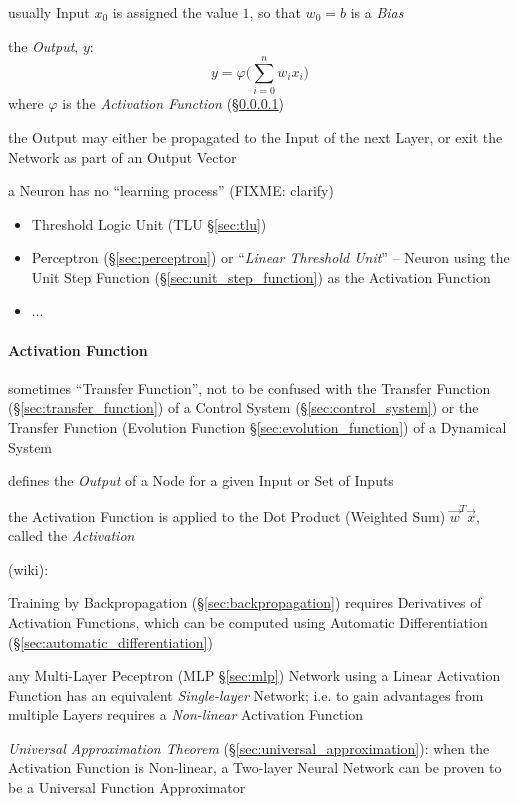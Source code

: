 usually Input $x_0$ is assigned the value $1$, so that $w_0 = b$ is a
\emph{Bias}

the \emph{Output}, $y$:
\[
  y = \varphi \Big( \sum_{i=0}^n w_i x_i \Big)
\]
where $\varphi$ is the \emph{Activation Function}
(\S\ref{sec:activation_function})

the Output may either be propagated to the Input of the next Layer, or exit the
Network as part of an Output Vector

a Neuron has no ``learning process'' (FIXME: clarify)

\begin{itemize}
  \item Threshold Logic Unit (TLU \S\ref{sec:tlu})
  \item Perceptron (\S\ref{sec:perceptron}) or ``\emph{Linear Threshold Unit}''
    -- Neuron using the Unit Step Function (\S\ref{sec:unit_step_function}) as
    the Activation Function
  \item ...
\end{itemize}



\paragraph{Activation Function}\label{sec:activation_function}\hfill

sometimes ``Transfer Function'', not to be confused with the Transfer Function
(\S\ref{sec:transfer_function}) of a Control System (\S\ref{sec:control_system})
or the Transfer Function (Evolution Function \S\ref{sec:evolution_function}) of
a Dynamical System

defines the \emph{Output} of a Node for a given Input or Set of Inputs

the Activation Function is applied to the Dot Product (Weighted Sum)
$\vec{w}^T \vec{x}$, called the \emph{Activation}

(wiki):

Training by Backpropagation (\S\ref{sec:backpropagation}) requires Derivatives
of Activation Functions, which can be computed using Automatic Differentiation
(\S\ref{sec:automatic_differentiation})

any Multi-Layer Peceptron (MLP \S\ref{sec:mlp}) Network using a Linear
Activation Function has an equivalent \emph{Single-layer} Network; i.e. to gain
advantages from multiple Layers requires a \emph{Non-linear} Activation Function

\emph{Universal Approximation Theorem} (\S\ref{sec:universal_approximation}):
when the Activation Function is Non-linear, a Two-layer Neural Network can be
proven to be a Universal Function Approximator

